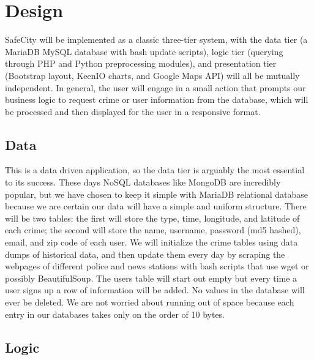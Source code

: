 \documentclass[paper=a4, fontsize=11pt]{scrartcl} %
\numberwithin{equation}{section} %
\numberwithin{figure}{section} %
\numberwithin{table}{section} %
\begin{document}

\section{Design}

SafeCity will be implemented as a classic three-tier system, with the data tier (a MariaDB MySQL database with bash update scripts), logic tier (querying through PHP and Python preprocessing modules), and presentation tier (Bootstrap layout, KeenIO charts, and Google Maps API) will all be mutually independent. In general, the user will engage in a small action that prompts our business logic to request crime or user information from the database, which will be processed and then displayed for the user in a responsive format. \\


\subsection{Data}

This is a data driven application, so the data tier is arguably the most essential to its success. These days NoSQL databases like MongoDB are incredibly popular, but we have chosen to keep it simple with MariaDB relational database because we are certain our data will have a simple and uniform structure. There will be two tables: the first will store the type, time, longitude, and latitude of each crime; the second will store the name, username, password (md5 hashed), email, and zip code of each user. We will initialize the crime tables using data dumps of historical data, and then update them every day by scraping the webpages of different police and news stations with bash scripts that use wget or possibly BeautifulSoup. The users table will start out empty but every time a user signs up a row of information will be added. No values in the database will ever be deleted. We are not worried about running out of space because each entry in our databases takes only on the order of 10 bytes.


\subsection{Logic}
\end{document}
